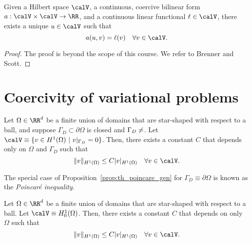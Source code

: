 \begin{theorem}
  Given a Hilbert space $\calV$, a continuous, coercive bilinear form $a: \calV \times \calV \to \RR$, and a continuous linear functional $\ell \in \calV$, there exists a unique $u \in \calV$ such that
  \begin{equation*}
    a(u,v) = \ell(v) \quad \forall v \in \calV.
  \end{equation*}
  \begin{proof}
    The proof is beyond the scope of this course.  We refer to Brenner and Scott.
  \end{proof}
\end{theorem}

\section{Coercivity of variational problems}

\begin{proposition}
  \label{prop:th_poincare_gen}
  Let $\Omega \in \RR^d$ be a finite union of domains that are star-shaped with respect to a ball, and suppose $\Gamma_D \subset \partial \Omega$ is closed and $\Gamma_D \neq \empty$.  Let $\calV \equiv \{ v \in H^1(\Omega) \ | \ v|_{\Gamma_D} = 0 \}$.  Then, there exists a constant $C$ that depends only on $\Omega$ and $\Gamma_D$ such that
  \begin{equation*}
    \| v \|_{H^1(\Omega)} \leq C | v |_{H^1(\Omega)} \quad \forall v \in \calV.
  \end{equation*}
\end{proposition}
The special case of Proposition~\ref{prop:th_poincare_gen} for $\Gamma_D \equiv \partial \Omega$ is known as the \emph{Poincar\'e inequality}.
\begin{proposition}
  Let $\Omega \in \RR^d$ be a finite union of domains that are star-shaped with respect to a ball. Let $\calV \equiv H^1_0(\Omega)$. Then, there exists a constant $C$ that depends on only $\Omega$ such that
  \begin{equation*}
    \| v \|_{H^1(\Omega)} \leq C | v |_{H^1(\Omega)} \quad \forall v \in \calV.
  \end{equation*}
\end{proposition}


